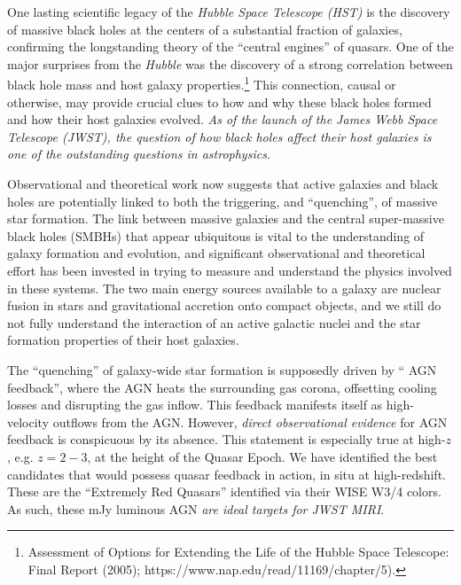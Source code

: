One lasting scientific legacy of the {\it Hubble Space Telescope
(HST)} is the discovery of massive black holes at the centers of 
a substantial fraction of galaxies, confirming the longstanding theory of the ``central
engines'' of quasars.  One of the major surprises from the {\it
Hubble} was the discovery of a strong correlation between black hole mass and
host galaxy properties.\footnote{Assessment of Options for Extending
the Life of the Hubble Space Telescope: Final Report (2005);
https://www.nap.edu/read/11169/chapter/5).}  This connection, causal
or otherwise, may provide crucial clues to how and why these black
holes formed and how their host galaxies evolved. {\it As of the
launch of the James Webb Space Telescope (JWST), the question of how
black holes affect their host galaxies is one of the outstanding
questions in astrophysics.}

\smallskip \smallskip
\noindent
Observational and theoretical work now suggests that active galaxies
and black holes are potentially linked to both the triggering, and
``quenching'', of massive star formation. The link between massive
galaxies and the central super-massive black holes (SMBHs) that appear 
ubiquitous is vital to the understanding of
galaxy formation and evolution, and significant observational and
theoretical effort has been invested in trying to measure and
understand the physics involved in these systems.  The two
main energy sources available to a galaxy are nuclear fusion in stars
and gravitational accretion onto compact objects, and we still do not
fully understand the interaction of an active galactic nuclei and the
star formation properties of their host galaxies. %

\smallskip \smallskip
\noindent
The ``quenching'' of galaxy-wide star formation is supposedly driven
by `` AGN feedback'', where the AGN heats the surrounding gas
corona, offsetting cooling losses and disrupting the gas inflow. This
feedback manifests itself as high-velocity outflows from the
AGN.  However, {\it direct observational evidence} for AGN
feedback is conspicuous by its absence. This statement is especially true at
high-$z$, e.g. $z=2-3$, at the height of the Quasar Epoch.  We have
identified the best candidates that would possess quasar
feedback in action, in situ at high-redshift. These are the
``Extremely Red Quasars'' identified via their WISE W3/4 colors.  As
such, these mJy luminous AGN {\it are ideal targets for JWST
MIRI}.


